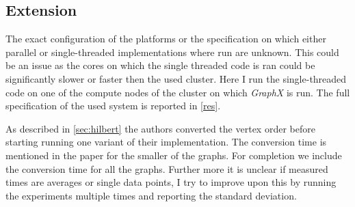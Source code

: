 \subsection{Extension}
The exact configuration of the platforms or the specification on which either parallel or single-threaded implementations where run are unknown. This could be an issue as the cores on which the single threaded code is ran could be significantly slower or faster then the used cluster. Here I run the single-threaded code on one of the compute nodes of the cluster on which \textit{GraphX} is run. The full specification of the used system is reported in \cref{res}.

As described in \cref{sec:hilbert} the authors converted the vertex order before starting running one variant of their implementation. The conversion time is mentioned in the paper for the smaller of the graphs. For completion we include the conversion time for all the graphs. Further more it is unclear if measured times are averages or single data points, I try to improve upon this by running the experiments multiple times and reporting the standard deviation.
